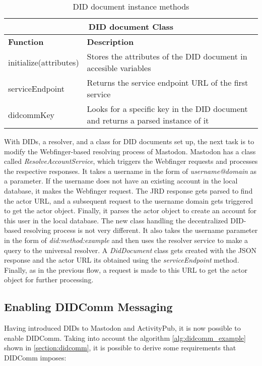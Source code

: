 \begin{table}[!ht]
	\centering
	\begin{tabular}{|p{5cm}|p{10cm}| }
    \hline
    \multicolumn{2}{|c|}{DID document Class} \\
    \hline
    \textbf{Function} & \textbf{Description} \\
		\hline
		\hline
      initialize(attributes) &  Stores the attributes of the DID document in accesible variables\\
    \hline
      serviceEndpoint & Returns the service endpoint URL of the first service \\
    \hline
      didcommKey & Looks for a specific key in the DID document and returns a parsed instance of it \\
    \hline
	\end{tabular}
	\caption{DID document instance methods}
  \label{table:did_doc_instance_methods}
\end{table}

With DIDs, a resolver, and a class for DID documents set up, the next task is to modify the Webfinger-based resolving process of Mastodon. Mastodon has a class called \emph{ResolveAccountService}, which triggers the Webfinger requests and processes the respective responses. It takes a username in the form of \emph{username@domain} as a parameter. If the username does not have an existing account in the local database, it makes the Webfinger request. The JRD response gets parsed to find the actor URL, and a subsequent request to the username domain gets triggered to get the actor object. Finally, it parses the actor object to create an account for this user in the local database.
The new class handling the decentralized DID-based resolving process is not very different. It also takes the username parameter in the form of \emph{did:method:example} and then uses the resolver service to make a query to the universal resolver. A \emph{DidDocument} class gets created with the JSON response and the actor URL its obtained using the \emph{serviceEndpoint} method. Finally, as in the previous flow, a request is made to this URL to get the actor object for further processing.

\subsection{Enabling DIDComm Messaging}\label{section:enabling_didcomm}

Having introduced DIDs to Mastodon and ActivityPub, it is now possible to enable DIDComm. Taking into account the algorithm \ref{alg:didcomm_example} shown in \autoref{section:didcomm}, it is possible to derive some requirements that DIDComm imposes:

